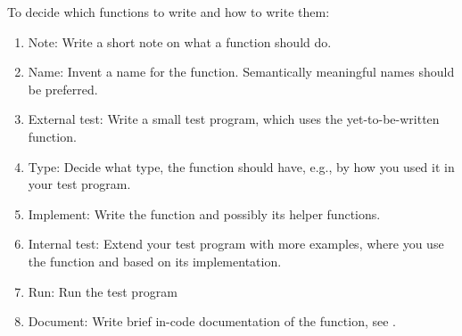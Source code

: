 \documentclass[fsharpNotes.tex]{subfiles}
\begin{document}
To decide which functions to write and how to write them:
\begin{enumerate}
\item Note: Write a short note on what a function should do.
\item Name: Invent a name for the function. Semantically meaningful names should be preferred.
\item External test: Write a small test program, which uses the yet-to-be-written function.
\item Type: Decide what type, the function should have, e.g., by how you used it in your test program.
\item Implement: Write the function and possibly its helper functions.
\item Internal test: Extend your test program with more examples, where you use the function and based on its implementation.
\item Run: Run the test program
\item Document: Write brief in-code documentation of the function, see .
\end{enumerate}
\end{document}
